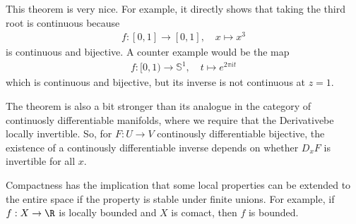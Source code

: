 This theorem is very nice. For example, it directly shows that taking the third root is continuous because
\begin{align*}
  f: [0,1] \to [0,1], \quad x \mapsto  x^{3}
\end{align*}
is continuous and bijective. A counter example would be the map
\begin{align*}
  f: [0,1) \to \mathbb{S}^{1}, \quad t \mapsto  e^{2 \pi i t}
\end{align*}
which is continuous and bijective, but its inverse is not continuous at $z = 1$.

The theorem is also a bit stronger than its analogue in the category of continuosly differentiable manifolds, where we require that the Derivativebe locally invertible. 
So, for $F: U \to V$ continously differentiable bijective, the existence of a continously differentiable inverse depends on whether $D_xF$ is invertible for all $x$.


Compactness has the implication that some local properties can be extended to the entire space if the property is stable under finite unions.
For example, if $f: X \to \R$ is locally bounded and $X$ is comact, then $f$ is bounded.


